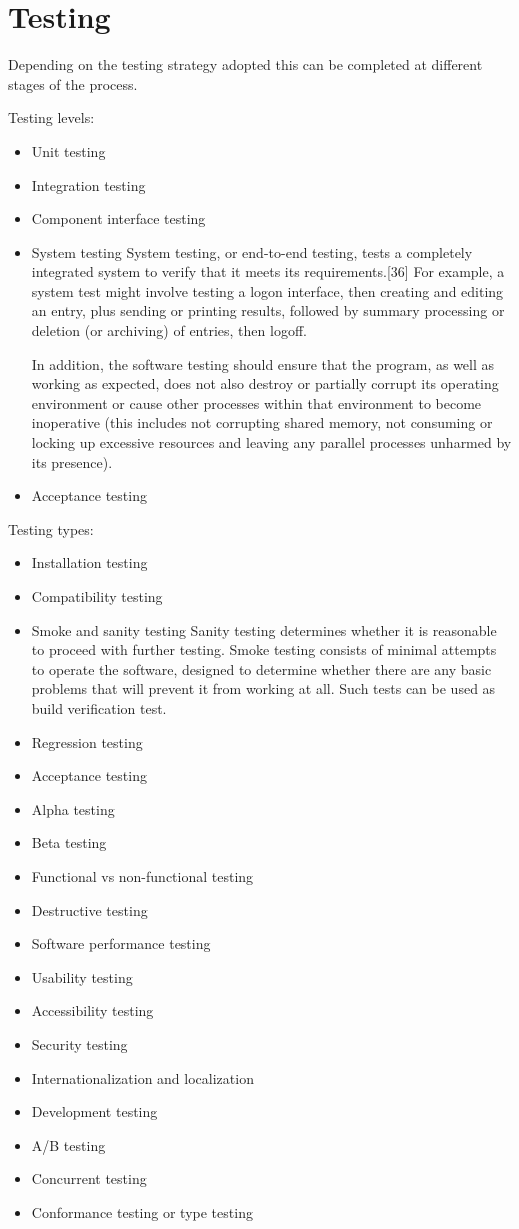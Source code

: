 \section{Testing}
Depending on the testing strategy adopted this can be completed at different
stages of the process.

Testing levels:
\begin{itemize}
\item Unit testing
\item Integration testing
\item Component interface testing
\item System testing
System testing, or end-to-end testing, tests a completely integrated system 
to verify that it meets its requirements.[36] For example, a system test 
might involve testing a logon interface, then creating and editing an entry, 
plus sending or printing results, followed by summary processing or deletion
(or archiving) of entries, then logoff.

In addition, the software testing should ensure that the program, as well
as working as expected, does not also destroy or partially corrupt its 
operating environment or cause other processes within that environment
to become inoperative (this includes not corrupting shared memory, not 
consuming or locking up excessive resources and leaving any parallel 
processes unharmed by its presence).
\item Acceptance testing
\end{itemize}

Testing types:
\begin{itemize}
\item Installation testing
\item Compatibility testing
\item Smoke and sanity testing
Sanity testing determines whether it is reasonable to proceed with 
further testing.
Smoke testing consists of minimal attempts to operate the software, 
designed to determine whether there are any basic problems that will 
prevent it from working at all. Such tests can be used as build 
verification test.
\item Regression testing
\item Acceptance testing
\item Alpha testing
\item Beta testing
\item Functional vs non-functional testing
\item Destructive testing
\item Software performance testing
\item Usability testing
\item Accessibility testing
\item Security testing
\item Internationalization and localization
\item Development testing
\item A/B testing
\item Concurrent testing
\item Conformance testing or type testing
\end{itemize}


